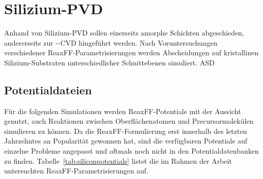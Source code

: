 \section{Silizium-PVD}
\label{siliconpvd}

Anhand von Silizium-PVD sollen einerseits amorphe Schichten abgeschieden, andererseits zur --CVD hingeführt werden.
Nach Voruntersuchungen verschiedener ReaxFF-Para\-metrisierungen werden Abscheidungen auf kristallinen Silizium-Substraten unterschiedlicher Schnittebenen simuliert.
ASD

\subsection{Potentialdateien}

Für die folgenden Simulationen werden ReaxFF-Potentiale mit der Aussicht genutzt, auch Reaktionen zwischen Oberflächenatomen und Precursormolekülen simulieren zu können.
Da die ReaxFF-Formulierung erst innerhalb des letzten Jahrzehntes an Popularität gewonnen hat, sind die verfügbaren Potentiale auf einzelne Probleme angepasst und oftmals noch nicht in den Potentialdatenbanken zu finden.
Tabelle~\ref{tab:siliconpotentials} listet die im Rahmen der Arbeit untersuchten ReaxFF-Parametrisierungen auf.

